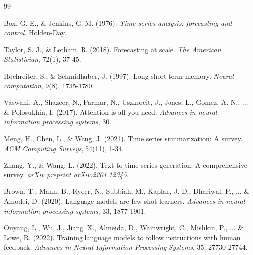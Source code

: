 \documentclass[11pt]{article}
\begin{document}

\begin{thebibliography}{99}

Box, G. E., \& Jenkins, G. M. (1976).
\textit{Time series analysis: forecasting and control}.
Holden-Day.

Taylor, S. J., \& Letham, B. (2018).
Forecasting at scale.
\textit{The American Statistician}, 72(1), 37-45.

Hochreiter, S., \& Schmidhuber, J. (1997).
Long short-term memory.
\textit{Neural computation}, 9(8), 1735-1780.

Vaswani, A., Shazeer, N., Parmar, N., Uszkoreit, J., Jones, L., Gomez, A. N., ... \& Polosukhin, I. (2017).
Attention is all you need.
\textit{Advances in neural information processing systems}, 30.

Meng, H., Chen, L., \& Wang, J. (2021).
Time series summarization: A survey.
\textit{ACM Computing Surveys}, 54(11), 1-34.

Zhang, Y., \& Wang, L. (2022).
Text-to-time-series generation: A comprehensive survey.
\textit{arXiv preprint arXiv:2201.12345}.

Brown, T., Mann, B., Ryder, N., Subbiah, M., Kaplan, J. D., Dhariwal, P., ... \& Amodei, D. (2020).
Language models are few-shot learners.
\textit{Advances in neural information processing systems}, 33, 1877-1901.

Ouyang, L., Wu, J., Jiang, X., Almeida, D., Wainwright, C., Mishkin, P., ... \& Lowe, R. (2022).
Training language models to follow instructions with human feedback.
\textit{Advances in Neural Information Processing Systems}, 35, 27730-27744.

\end{thebibliography}
\end{document}
